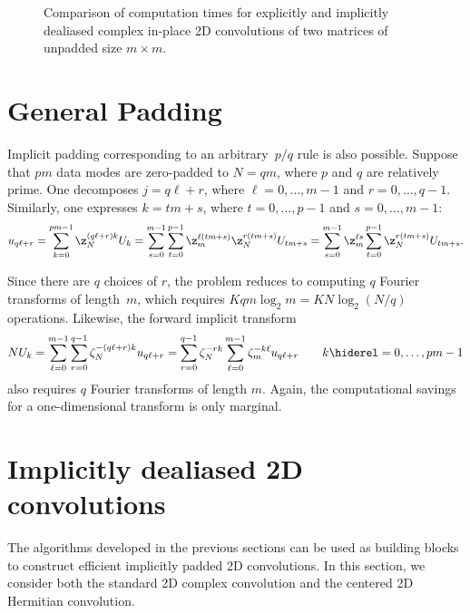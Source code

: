\documentclass[final]{siamltex}
\def\no{\hiderel}
\begin{document}
\begin{figure}[htbp]
\begin{minipage}{0.5\linewidth}
\begin{center}
\caption{Comparison of computation times for explicitly and implicitly
dealiased complex in-place 2D convolutions of two matrices of
unpadded size $m\times m$.}
\label{timing2c}
\end{center}
\end{minipage}
\end{figure}

\section{General Padding}\label{pq}
Implicit padding corresponding to an arbitrary~$p/q$ rule is also
possible. Suppose that $pm$ data modes are zero-padded to $N=qm$, where $p$
and $q$ are relatively prime. One decomposes $j=q\ell+r$, where
$\ell=0,\dots,m-1$ and $r=0,\dots,q-1$.
Similarly, one expresses $k=t m+s$, where $t=0,\dots,p-1$ and $s=0,\dots, m-1$:
$$
u_{q\ell+r}=\sum_{k=0}^{pm-1}\z_N^{(q\ell+r)k} U_k
=\sum_{s=0}^{m-1}\sum_{t=0}^{p-1} \z_m^{\ell (t m+s)}\z_{N}^{r(t m+s)}
U_{t m+s}
=\sum_{s=0}^{m-1}\z_m^{\ell s}\sum_{t=0}^{p-1}\z_N^{r(t m+s)} U_{t m+s}.
$$

Since there are $q$ choices of $r$, the problem reduces
to computing $q$ Fourier transforms of length~$m$, which requires
$K q m\log_2 m=K N\log_2 (N/q)$ operations. 
Likewise, the forward implicit transform
$$
NU_k
=\sum_{\ell=0}^{m-1}\sum_{r=0}^{q-1} \zeta_N^{-(q\ell+r)k} u_{q\ell+r}
=\sum_{r=0}^{q-1}\zeta_N^{-rk}\sum_{\ell=0}^{m-1}\zeta_m^{-k\ell} u_{q\ell+r}
\qquad k\no =0,\ldots,pm-1
$$
also requires $q$ Fourier transforms of length $m$. Again, the computational
savings for a one-dimensional transform is only marginal.

\section{Implicitly dealiased 2D convolutions}\label{2d}
The algorithms developed in the previous sections can be used as building
blocks to construct efficient implicitly padded 2D convolutions.
In this section, we consider both the standard 2D complex convolution and the
centered 2D Hermitian convolution.
\end{document}
